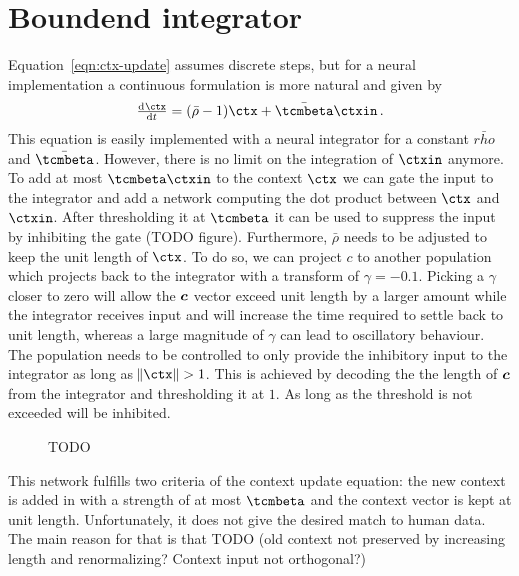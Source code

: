 \section{Boundend integrator}
Equation~\ref{eqn:ctx-update} assumes discrete steps, but for a neural implementation a continuous formulation is more natural and given by
\begin{equation}
    \od{\ctx}{t} = (\bar{\rho} - 1) \ctx + \bar{\tcmbeta} \ctxin\,\text{.}
\end{equation}
This equation is easily implemented with a neural integrator for a constant $\bar{rho}$ and $\bar{\tcmbeta}$.
However, there is no limit on the integration of $\ctxin$ anymore.
To add at most $\tcmbeta \ctxin$ to the context $\ctx$ we can gate the input to the integrator and add a network computing the dot product between $\ctx$ and $\ctxin$.
After thresholding it at $\tcmbeta$ it can be used to suppress the input by inhibiting the gate (TODO figure).
Furthermore, $\bar{\rho}$ needs to be adjusted to keep the unit length of $\ctx$.
To do so, we can project $c$ to another population  which projects back to the integrator with a transform of $\gamma = -0.1$.
Picking a $\gamma$ closer to zero will allow the $\bm{c}$ vector exceed unit length by a larger amount while the integrator receives input and will increase the time required to settle back to unit length, whereas a large magnitude of $\gamma$ can lead to oscillatory behaviour.
The  population needs to be controlled to only provide the inhibitory input to the integrator as long as $\norm{\ctx} > 1$.
This is achieved by decoding the the length of $\bm{c}$ from the integrator and thresholding it at $1$.
As long as the threshold is not exceeded  will be inhibited.
\begin{figure}
    \caption{TODO}
\end{figure}

This network fulfills two criteria of the context update equation: the new context is added in with a strength of at most $\tcmbeta$ and the context vector is kept at unit length.
Unfortunately, it does not give the desired match to human data.
The main reason for that is that TODO (old context not preserved by increasing length and renormalizing? Context input not orthogonal?)

